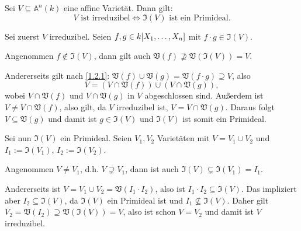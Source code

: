 \documentclass[a4paper,12pt]{scrbook}
\makeatletter
\theoremstyle{blah}
\theoremstyle{stz}
\renewcommand{\proofname}{Beweis}
\renewenvironment{proof}[1][\proofname]{\par
  \pushQED{\qed}%
  \normalfont \topsep6\p@\@plus6\p@\relax
  \trivlist
  \item[\hskip\labelsep
        \itshape
    #1\@addpunct{:}]\ignorespaces
}{%
  \popQED\endtrivlist\@endpefalse
}
\def\A{\mathbb{A}}
\def\V{\mathfrak{V}}
\def\I{\mathfrak{I}}
\newcommand{\polyx}[1][n]{\ensuremath%
  [X_{1},\dotsc,X_{#1}]}
\makeatother
\begin{document}
\begin{bem}\label{1.2.9}
Sei $V\subseteq\A^{n}(k)$ eine affine Varietät. Dann gilt:
\[V\text{ ist irreduzibel}\iff\I(V)\text{ ist ein Primideal}.\]
\end{bem}
\begin{proof}
Sei zuerst $V$ irreduzibel. Seien $f,g\in k\polyx$ mit $f\cdot g\in\I(V)$. 

Angenommen $f\notin\I(V)$, dann gilt auch $\V(f)\not\supseteq\V(\I(V))=V$.

Andererseits gilt nach \autoref{1.2.1}: $\V(f)\cup\V(g)=\V(f\cdot g)\supseteq V$, also
\[V=(V\cap \V(f))\cup(V\cap\V(g)),\]
wobei $V\cap\V(f)$ und $V\cap\V(g)$ in $V$ abgeschlossen sind. Außerdem ist $V\neq V\cap\V(f)$, also gilt, da $V$ irreduzibel ist, $V=V\cap\V(g)$. Daraus folgt $V\subseteq\V(g)$ und damit ist $g\in\I(V)$ und $\I(V)$ ist somit ein Primideal.

Sei nun $\I(V)$ ein Primideal. Seien $V_{1},V_{2}$ Varietäten mit $V=V_{1}\cup V_{2}$ und $I_{1}:=\I(V_{1})$, $I_{2}:=\I(V_{2})$.

Angenommen $V\neq V_{1}$, d.h. $V\supsetneq V_{1}$, dann ist auch $\I(V)\subsetneq\I(V_{1})=I_{1}$.

Andererseits ist $V=V_{1}\cup V_{2}=\V(I_{1}\cdot I_{2})$, also ist $I_{1}\cdot I_{2}\subseteq\I(V)$. Das impliziert aber $I_{2}\subseteq\I(V)$, da $\I(V)$ ein Primideal ist und $I_{1}\not\subseteq\I(V)$. Daher gilt $V_{2}=\V(I_{2})\supseteq\V(\I(V))=V$, also ist schon $V=V_{2}$ und damit ist $V$ irreduzibel.
\end{proof}
\end{document}
